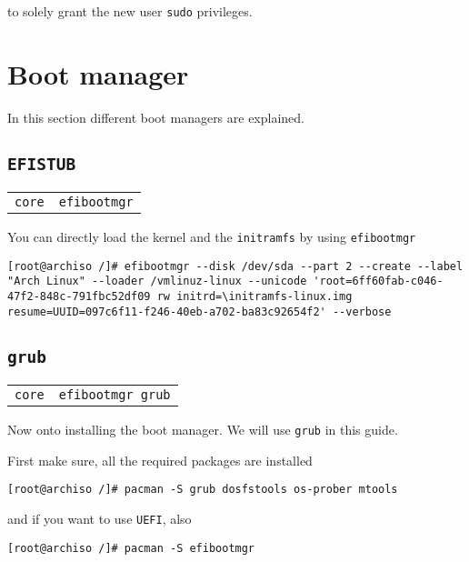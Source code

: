 \documentclass[9pt]{report}
\newenvironment{packagetable}
{\begin{longtabu}to \textwidth [b]{X[1,r]|X[1,l]}}
{\end{longtabu}}
\begin{document}
to solely grant the new user \texttt{sudo} privileges.


\hypertarget{x-boot-manager}{\section{Boot manager}}
In this section different boot managers are explained.



\newpage

\hypertarget{x-efistub}{\subsection{\texttt{EFISTUB}}}
\begin{packagetable}
    \texttt{core} & \texttt{efibootmgr} \\ 
\end{packagetable}

You can directly load the kernel and the \texttt{initramfs} by using \texttt{efibootmgr}


\begin{verbatim}
[root@archiso /]# efibootmgr --disk /dev/sda --part 2 --create --label "Arch Linux" --loader /vmlinuz-linux --unicode 'root=6ff60fab-c046-47f2-848c-791fbc52df09 rw initrd=\initramfs-linux.img resume=UUID=097c6f11-f246-40eb-a702-ba83c92654f2' --verbose
\end{verbatim}


\newpage

\hypertarget{x-grub}{\subsection{\texttt{grub}}}
\begin{packagetable}
    \texttt{core} & \texttt{efibootmgr grub} \\ 
\end{packagetable}

Now onto installing the boot manager.
We will use \texttt{grub} in this guide.


First make sure, all the required packages are installed


\begin{verbatim}
[root@archiso /]# pacman -S grub dosfstools os-prober mtools
\end{verbatim}

and if you want to use \texttt{UEFI}, also


\begin{verbatim}
[root@archiso /]# pacman -S efibootmgr
\end{verbatim}
\end{document}
